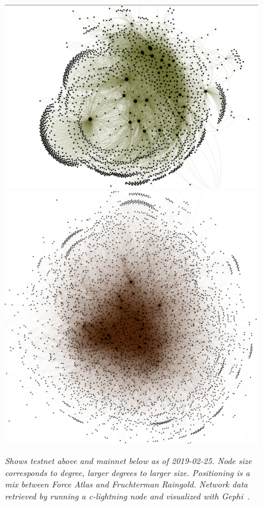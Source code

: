 \newpage
\onecolumn

\begin{figure}[!htb]
	\hspace*{-0.7cm} 
	\centering
	\includegraphics[width=12cm]{graphs/testnet_force.png}
	\vspace*{-0.4cm} 
	\includegraphics[width=13.6cm]{graphs/mainnet_force3.png}
	\caption{\textit{
			Shows testnet above and mainnet below as of 2019-02-25. Node size corresponds to degree, larger degrees to larger size. Positioning is a mix between Force Atlas and Fruchterman Raingold. Network data retrieved by running a c-lightning node and visualized with Gephi~\cite{repository:gephi}.}}
	\label{fig:topology}
	\hspace*{2mm} 	
\end{figure}
\newpage
\twocolumn

